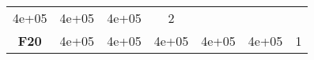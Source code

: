 \documentclass[12pt,a4paper]{article}
\begin{document}
\begin{longtable}[c]{@{}ccccccc@{}}
\begin{minipage}[t]{0.09\columnwidth}\centering\strut
4e+05
\strut\end{minipage} &
\begin{minipage}[t]{0.10\columnwidth}\centering\strut
4e+05
\strut\end{minipage} &
\begin{minipage}[t]{0.11\columnwidth}\centering\strut
4e+05
\strut\end{minipage} &
\begin{minipage}[t]{0.07\columnwidth}\centering\strut
2
\strut\end{minipage}\tabularnewline
\begin{minipage}[t]{0.11\columnwidth}\centering\strut
\textbf{F20}
\strut\end{minipage} &
\begin{minipage}[t]{0.08\columnwidth}\centering\strut
4e+05
\strut\end{minipage} &
\begin{minipage}[t]{0.08\columnwidth}\centering\strut
4e+05
\strut\end{minipage} &
\begin{minipage}[t]{0.09\columnwidth}\centering\strut
4e+05
\strut\end{minipage} &
\begin{minipage}[t]{0.10\columnwidth}\centering\strut
4e+05
\strut\end{minipage} &
\begin{minipage}[t]{0.11\columnwidth}\centering\strut
4e+05
\strut\end{minipage} &
\begin{minipage}[t]{0.07\columnwidth}\centering\strut
1
\strut\end{minipage}\tabularnewline
\bottomrule
\end{longtable}
\end{document}
